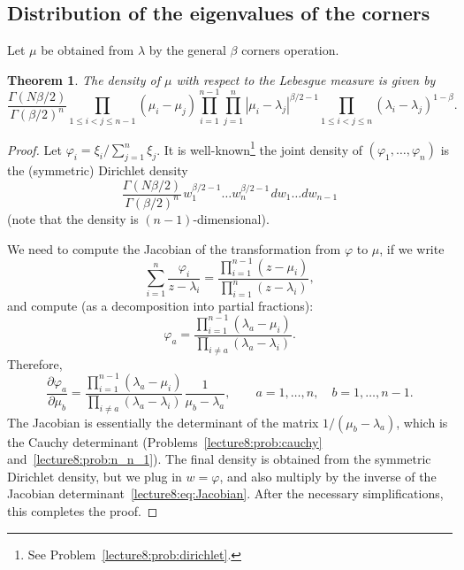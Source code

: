 \documentclass[letterpaper,11pt,oneside,reqno]{book}
\numberwithin{equation}{chapter}  %
\newcommand{\ssp}{\hspace{1pt}}
\newtheorem{theorem}[proposition]{Theorem}
\theoremstyle{definition}
\begin{document}
\subsection{Distribution of the eigenvalues of the corners}

Let $\mu$ be obtained from $\lambda$ by the general $\beta$ corners operation.

\begin{theorem}
	\label{lecture8:thm:corner_step}
	The density of $\mu$ with respect to the Lebesgue measure is given by
	\begin{equation*}
		\frac{\Gamma(N \beta/2)}{\Gamma(\beta/2)^n}
		\prod_{1\le i<j\le n-1}(\mu_i-\mu_j)
		\prod_{i=1}^{n-1}\prod_{j=1}^n |\mu_i-\lambda_j|^{\beta/2-1}
		\prod_{1\le i<j\le n}(\lambda_i-\lambda_j)^{1-\beta}.
	\end{equation*}
\end{theorem}
\begin{proof}
	Let $\varphi_i=\xi_i/\sum_{j=1}^n \xi_j$.
	It is well-known\footnote{See Problem~\ref{lecture8:prob:dirichlet}.}
	the joint
	density of $(\varphi_1,\ldots,\varphi_n )$ is the
	(symmetric) Dirichlet density
	\begin{equation*}
		\frac{\Gamma(N \beta/2)}{\Gamma(\beta/2)^n}
		\ssp
		w_1^{\beta/2-1}\ldots  w_n^{\beta/2-1}
		\ssp
		dw_1\ldots dw_{n-1}
	\end{equation*}
	(note that the density is $(n-1)$-dimensional).

	We need to compute the Jacobian of the transformation from $\varphi$ to $\mu$,
	if we write
	\begin{equation*}
		\sum_{i=1}^n\frac{\varphi_i}{z-\lambda_i}=
		\frac{\prod_{i=1}^{n-1}(z-\mu_i)}
		{\prod_{i=1}^n(z-\lambda_i)},
	\end{equation*}
	and compute
	(as a decomposition into partial fractions):
	\begin{equation*}
		\varphi_a=
		\frac{\prod_{i=1}^{n-1}(\lambda_a-\mu_i)}{\prod_{i\ne a}(\lambda_a-\lambda_i)}.
	\end{equation*}
	Therefore,
	\begin{equation}
		\label{lecture8:eq:Jacobian}
		\frac{\partial\varphi_a}{\partial\mu_b}=
		\frac{\prod_{i=1}^{n-1}(\lambda_a-\mu_i)}{\prod_{i\ne a}(\lambda_a-\lambda_i)}
		\ssp\frac{1}{\mu_b-\lambda_a},
		\qquad
		a=1,\ldots,n,\quad b=1,\ldots,n-1.
	\end{equation}
	The Jacobian is essentially the determinant of the matrix $1/(\mu_b-\lambda_a)$,
	which is the Cauchy determinant
	(Problems~\ref{lecture8:prob:cauchy} and~\ref{lecture8:prob:n_n_1}).
	The final density is obtained from the symmetric Dirichlet density,
	but we plug in $w=\varphi$, and also multiply by the inverse of the Jacobian determinant~\eqref{lecture8:eq:Jacobian}.
	After the necessary simplifications, this completes the proof.
\end{proof}
\end{document}
